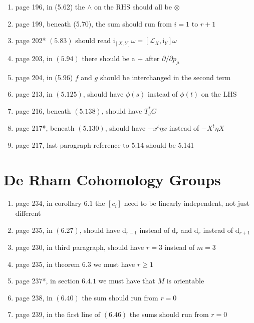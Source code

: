 \documentclass{article}
\newcommand\Dag{\textsuperscript{\dagger}}
\begin{document}
\begin{enumerate}

\item page 196, in (5.62) the $\wedge$ on the RHS should all be $\otimes$

\item page 199, beneath (5.70), the sum should run from $i=1$ to $r+1$

\item page 202* $(5.83)$ should read $\mathrm{i}_{[X, Y]} \omega=\left[\mathcal{L}_{X}, \mathrm{i}_{Y}\right] \omega$

\item page 203, in $(5.94)$ there should be a $+$ after $\partial / \partial p_{\mu}$

\item page 204, in (5.96) $f$ and $g$ should be interchanged in the second term

\item page 213, in $(5.125)$, should have $\phi(s)$ instead of $\phi(t)$ on the LHS

\item page 216, beneath $(5.138)$, should have $T_{g}^{*} G$

\item page 217*, beneath $(5.130)$, should have $-x^{t} \eta x$ instead of $-X^{t} \eta X$

\item page 217\Dag, last paragraph reference to 5.14 should be 5.141

\end{enumerate}
\section*{De Rham Cohomology Groups}

\begin{enumerate}
\item page 234, in corollary $6.1$ the $\left[c_{i}\right]$ need to be linearly independent, not just different

\item page 235, in $(6.27)$, should have $\mathrm{d}_{r-1}$ instead of $\mathrm{d}_{r}$ and $\mathrm{d}_{r}$ instead of $\mathrm{d}_{r+1}$

\item page 230, in third paragraph, should have $r=3$ instead of $m=3$

\item page 235, in theorem $6.3$ we must have $r \geq 1$

\item page 237*, in section $6.4 .1$ we must have that $M$ is orientable

\item page 238, in $(6.40)$ the sum should run from $r=0$

\item page 239, in the first line of $(6.46)$ the sums should run from $r=0$
\end{enumerate}
\end{document}
